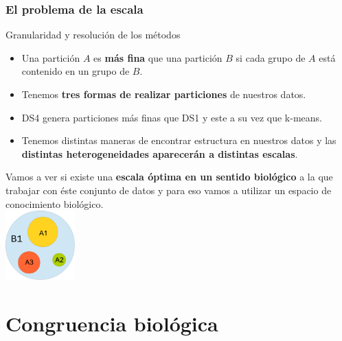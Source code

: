 \documentclass[serif,9pt, t]{beamer}
\begin{document}
\begin{frame}\frametitle{El problema de la escala} 
Granularidad y resolución de los métodos
\bigskip
\begin{itemize}
\item Una partición $A$ es \textbf{más fina} que una partición $B$ si cada grupo de $A$ está contenido en un grupo de $B$.
\item Tenemos \textbf{tres formas de realizar particiones} de nuestros datos.
\item DS4 genera particiones más finas que DS1 y este a su vez que k-means.
\item Tenemos distintas maneras de encontrar estructura en nuestros datos y las \textbf{distintas heterogeneidades aparecerán a distintas escalas}.
\end{itemize}
\bigskip
Vamos a ver si existe una \textbf{escala óptima en un sentido biológico} a la que trabajar con éste conjunto de datos y para eso vamos a utilizar un espacio de conocimiento biológico.\\
\hfill
\includegraphics[width=0.2\textwidth]{granularidad.pdf}	
\end{frame}

\section{Congruencia biológica}
\end{document}
